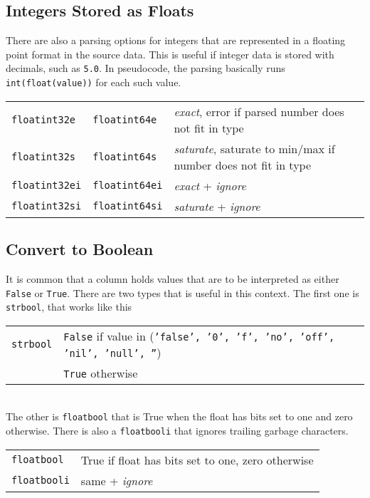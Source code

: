 \subsection{Integers Stored as Floats}

There are also a parsing options for integers that are represented in
a floating point format in the source data.  This is useful if integer
data is stored with decimals, such as \texttt{5.0}.  In pseudocode,
the parsing basically runs \texttt{int(float(value))} for each such
value.\\

\begin{tabular}{lll}
  \texttt{floatint32e} & \texttt{floatint64e}  & \emph{exact}, error if parsed number does not fit in type\\
  \texttt{floatint32s} & \texttt{floatint64s}  & \emph{saturate}, saturate to min/max if number does not fit in type\\
  \texttt{floatint32ei}& \texttt{floatint64ei} & \emph{exact} + \emph{ignore}\\
  \texttt{floatint32si}& \texttt{floatint64si} & \emph{saturate} + \emph{ignore}\\
\end{tabular}



\subsection{Convert to Boolean}
It is common that a column holds values that are to be interpreted as
either \texttt{False} or \texttt{True}.  There are two types that is
useful in this context.  The first one is \texttt{strbool}, that works like this\\

\begin{tabular}{ll}
  \texttt{strbool} & \texttt{False} if value in (\texttt{'false', '0', 'f', 'no', 'off', 'nil', 'null', ''})\\
                   & \texttt{True} otherwise
\end{tabular}
\\
The other is \texttt{floatbool} that is True when the float has bits
set to one and zero otherwise.  There is also a \texttt{floatbooli}
that ignores trailing garbage characters.\\

\begin{tabular}{ll}
  \texttt{floatbool}  & True if float has bits set to one, zero otherwise\\
  \texttt{floatbooli} & same + \emph{ignore}\\
\end{tabular}



